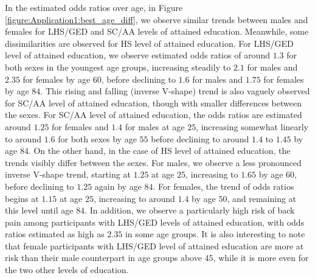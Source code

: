 \vspace{-0.2cm}
In the estimated odds ratios over age, in Figure \ref{figure:Application1:best_age_diff}, we observe similar trends between males and females for LHS/GED and SC/AA levels of attained education. Meanwhile, some dissimilarities are observed for HS level of attained education. For LHS/GED level of attained education, we observe estimated odds ratios of around $1.3$ for both sexes in the youngest age groups, increasing steadily to $2.1$ for males and $2.35$ for females by age $60$, before declining to $1.6$ for males and $1.75$ for females by age $84$. This rising and falling (inverse V-shape) trend is also vaguely observed for SC/AA level of attained education, though with smaller differences between the sexes. For SC/AA level of attained education, the odds ratios are estimated around $1.25$ for females and $1.4$ for males at age $25$, increasing somewhat linearly to around $1.6$ for both sexes by age $55$ before declining to around $1.4$ to $1.45$ by age $84$. On the other hand, in the case of HS level of attained education, the trends visibly differ between the sexes. For males, we observe a less pronounced inverse V-shape trend, starting at $1.25$ at age $25$, increasing to $1.65$ by age $60$, before declining to $1.25$ again by age $84$. For females, the trend of odds ratios begins at $1.15$ at age $25$, increasing to around $1.4$ by age $50$, and remaining at this level until age $84$. In addition, we observe a particularly high risk of back pain among participants with LHS/GED levels of attained education, with odds ratios estimated as high as $2.35$ in some age groups. It is also interesting to note that female participants with LHS/GED level of attained education are more at risk than their male counterpart in age groups above $45$, while it is more even for the two other levels of education. 

